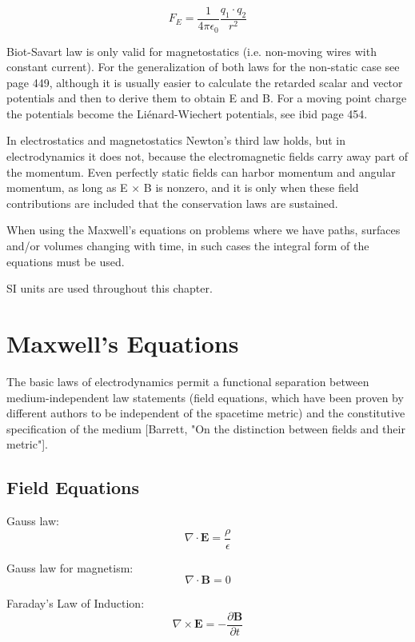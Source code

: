 \documentclass[english, 12pt]{book}
\begin{document}
\[
F_E = \frac{1}{4 \pi \epsilon_0} \frac{q_1 \cdot q_2}{r^2}
\]


Biot-Savart law is only valid for magnetostatics (i.e. non-moving wires with constant current). For the generalization of both laws for the non-static case see~\cite{Griffiths} page 449, although it is usually easier to calculate the retarded scalar and vector potentials and then to derive them to obtain E and B. For a moving point charge the potentials become the Liénard-Wiechert potentials, see ibid page 454.

In electrostatics and magnetostatics Newton's third law holds, but in electrodynamics it does not, because the electromagnetic fields carry away part of the momentum. Even perfectly static fields can harbor momentum and angular momentum, as long as E × B is nonzero, and it is only when these field contributions are included that the conservation laws are sustained.

When using the Maxwell's equations on problems where we have paths, surfaces and/or volumes changing with time, in such cases the integral form of the equations must be used.

SI units are used throughout this chapter.


\section{Maxwell's Equations}

The basic laws of electrodynamics permit a functional separation between medium-independent law statements (field equations, which have been proven by different authors to be independent of the spacetime metric) and the constitutive specification of the medium [Barrett, "On the distinction between fields and their metric"].

\subsection{Field Equations}

Gauss law:
\begin{equation}
\nabla\cdot\mathbf{E}=\frac{\rho}{\epsilon}    \label{eq:lawCoulomb}
\end{equation}

Gauss law for magnetism:
\begin{equation}
\nabla\cdot\mathbf{B}=0        \label{eq:lawGauss}
\end{equation}

Faraday's Law of Induction:
\begin{equation}
\nabla\times\mathbf{E}=-\frac{\partial\mathbf{B}}{\partial t}    \label{eq:lawFaraday}
\end{equation}
\end{document}
